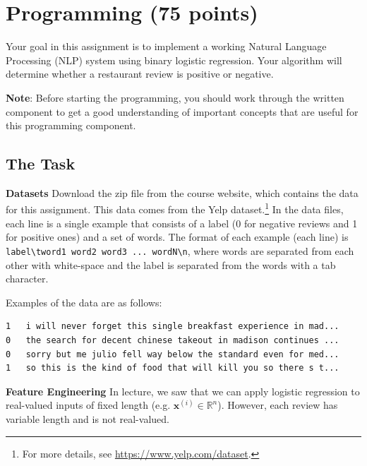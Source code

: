 \documentclass[11pt,addpoints,answers]{exam}
\newcommand{\xv}{\mathbf{x}}
\begin{document}
\begin{questions}
\begin{your_solution}[height=6cm]

\end{your_solution}
\newpage
\end{questions}
\section{Programming (75 points)}

Your goal in this assignment is to implement a working Natural Language Processing (NLP) system using binary logistic regression. Your algorithm will determine whether a restaurant review is positive or negative.

\textbf{Note}: Before starting the programming, you should work through the written component to get a good understanding of important concepts that are useful for this programming component.



\subsection{The Task}\label{task}

{\bf Datasets } 
Download the zip file from the course website, which contains the data for this assignment. This data comes from the Yelp dataset.\footnote{For more details, see \url{https://www.yelp.com/dataset}.} In the data files, each line is a single example that consists of a label (0 for negative reviews and 1 for positive ones) and a set of words. The format of each example (each line) is \lstinline{label\tword1 word2 word3 ... wordN\n}, where words are separated from each other with white-space and the label is separated from the words with a tab character.

Examples of the data are as follows:
 
\begin{lstlisting}
1   i will never forget this single breakfast experience in mad... 
0   the search for decent chinese takeout in madison continues ...
0   sorry but me julio fell way below the standard even for med...
1   so this is the kind of food that will kill you so there s t...
\end{lstlisting}

{\bf Feature Engineering } 
In lecture, we saw that we can apply logistic regression to real-valued inputs of fixed length (e.g. $\xv^{(i)}\in\mathbb{R}^n$). However, each review has variable length and is not real-valued.
\end{document}
